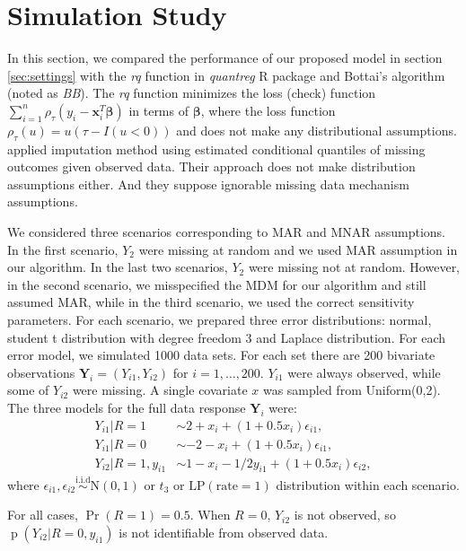 \documentclass[12pt]{article}
\newcommand{\iid}{\stackrel{\text{i.i.d}}{\sim}}
\DeclareMathOperator{\pr}{p}
\DeclareMathOperator{\prob}{Pr}
\begin{document}
\section{Simulation Study}
\label{sec:simulation}
In this section, we compared the performance of our proposed model in
section \ref{sec:settings} with the \textit{rq} function in
\textit{quantreg} R package \citep{quantreg} and Bottai's algorithm
\citep{bottai2013} (noted as \textit{BB}). The \textit{rq} function
minimizes the loss (check) function $\sum_{i=1}^n \rho_{\tau} (y_i -
\bm x_i^T \bm \beta)$ in terms of $\bm \beta$, where the loss function
$\rho_{\tau} (u) = u(\tau - I(u < 0))$ and does not make any
distributional assumptions. \citet{bottai2013} applied imputation
method using estimated conditional quantiles of missing outcomes given
observed data. Their approach does not make distribution assumptions
either.  And they suppose ignorable missing data mechanism
assumptions.

We considered three scenarios corresponding to MAR and MNAR
assumptions.  In the first scenario, $Y_2$ were missing at random and
we used MAR assumption in our algorithm. In the last two scenarios,
$Y_2$ were missing not at random. However, in the second scenario, we
misspecified the MDM for our algorithm and still assumed MAR, while in
the third scenario, we used the correct sensitivity parameters.  For
each scenario, we prepared three error distributions: normal, student
t distribution with degree freedom 3 and Laplace distribution. For
each error model, we simulated 1000 data sets. For each set there are
200 bivariate observations $\bm Y_i = (Y_{i1}, Y_{i2})$ for $i = 1,
\ldots, 200$. $Y_{i1}$ were always observed, while some of $Y_{i2}$
were missing. A single covariate $x$ was sampled from
Uniform(0,2). The three models for the full data response $\bm Y_i$
were:
\begin{align*}
  Y_{i1} | R = 1 & \sim 2 + x_i + (1 + 0.5x_i) \epsilon_{i1} , \\
  Y_{i1}| R = 0 & \sim  -2 - x_i + (1 + 0.5x_i) \epsilon_{i1} , \\
  Y_{i2}| R = 1, y_{i1}&\sim 1 - x_i - 1/2y_{i1} + (1 + 0.5x_i)
  \epsilon_{i2},
\end{align*}
where $\epsilon_{i1}, \epsilon_{i2} \iid \textrm{N}(0, 1)$ or $t_3$ or
$\text{LP}(\text{rate} = 1)$ distribution within each scenario.

For all cases, $\prob (R = 1) = 0.5$.  When $R = 0$, $Y_{i2}$ is not
observed, so $\pr(Y_{i2}| R = 0, y_{i1})$ is not identifiable from
observed data.
\end{document}
